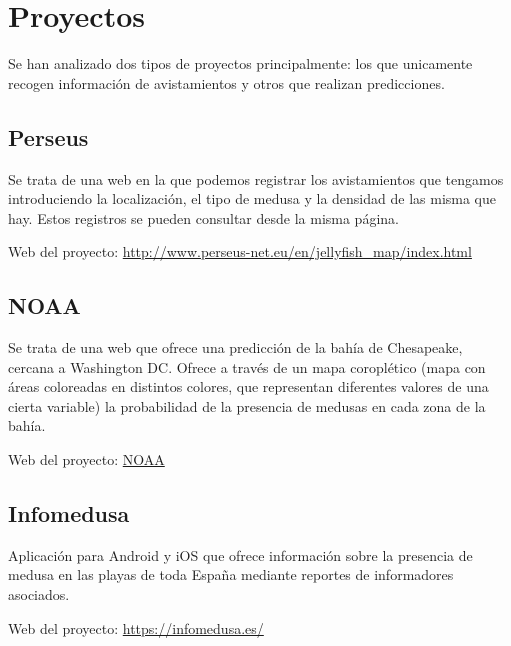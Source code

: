 \section{Proyectos}

Se han analizado dos tipos de proyectos principalmente: los que unicamente recogen información de avistamientos y otros que realizan predicciones.

\subsection{Perseus}

Se trata de una web en la que podemos registrar los avistamientos que tengamos introduciendo la localización, el tipo de medusa y la densidad de las misma que hay.
Estos registros se pueden consultar desde la misma página.

Web del proyecto: \href{http://www.perseus-net.eu/en/jellyfish_map/index.html}{http://www.perseus-net.eu/en/jellyfish\_map/index.html}

\subsection{NOAA}

Se trata de una web que ofrece una predicción de la bahía de Chesapeake, cercana a Washington DC. Ofrece a través de un mapa coroplético (mapa con áreas coloreadas en distintos colores, que representan diferentes valores de una cierta variable) la probabilidad de la presencia de medusas en cada zona de la bahía.

Web del proyecto: \href{https://ocean.weather.gov/Loops/ocean_guidance.php?model=Sea_Nettles&area=Prob&plot=prob&day=0&loop=1}{NOAA}

\subsection{Infomedusa}

Aplicación para Android y iOS que ofrece información sobre la presencia de medusa en las playas de toda España mediante reportes de informadores asociados.

Web del proyecto: \href{https://infomedusa.es/}{https://infomedusa.es/}